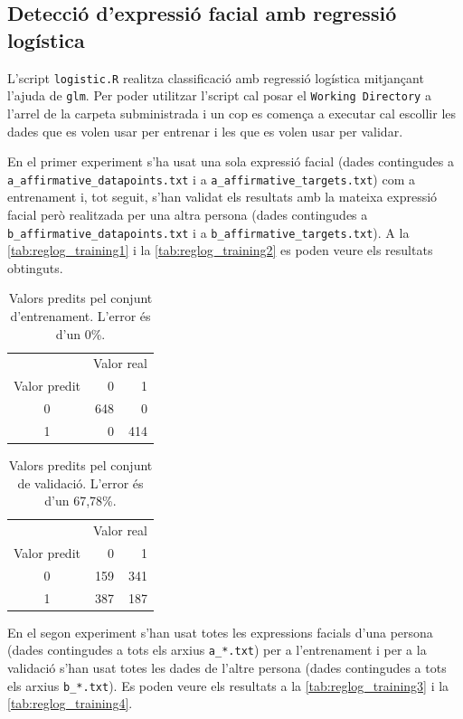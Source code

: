 \documentclass[a4paper]{article}
\begin{document}
\subsection{Detecció d'expressió facial amb regressió logística}
L'script \verb|logistic.R| realitza classificació amb regressió logística mitjançant l'ajuda de \verb|glm|. Per poder utilitzar l'script cal posar el \verb|Working Directory| a l'arrel de la carpeta subministrada i un cop es comença a executar cal escollir les dades que es volen usar per entrenar i les que es volen usar per validar.

En el primer experiment s'ha usat una sola expressió facial (dades contingudes a \verb|a_affirmative_datapoints.txt| i a \verb|a_affirmative_targets.txt|) com a entrenament i, tot seguit, s'han validat els resultats amb la mateixa expressió facial però realitzada per una altra persona (dades contingudes a \verb|b_affirmative_datapoints.txt| i a \verb|b_affirmative_targets.txt|). A la \autoref{tab:reglog_training1} i la \autoref{tab:reglog_training2} es poden veure els resultats obtinguts.

\begin{table}[H]
	\centering
	\def\arraystretch{1.5}
	\begin{tabular}{c|rr}
		& \multicolumn{2}{c}{Valor real} \\
		Valor predit & 0 & 1 \\
		\hline
		0 & 648 & 0 \\
		1 & 0 & 414 \\
	\end{tabular}
	\caption{Valors predits pel conjunt d'entrenament. L'error és d'un 0\%.}
	\label{tab:reglog_training1}
\end{table}

\begin{table}[H]
	\centering
	\def\arraystretch{1.5}
	\begin{tabular}{c|rr}
		& \multicolumn{2}{c}{Valor real} \\
		Valor predit & 0 & 1 \\
		\hline
		0 & 159 & 341 \\
		1 & 387 & 187 \\
	\end{tabular}
	\caption{Valors predits pel conjunt de validació. L'error és d'un 67,78\%.}
	\label{tab:reglog_training2}
\end{table}

En el segon experiment s'han usat totes les expressions facials d'una persona (dades contingudes a tots els arxius \verb|a_*.txt|) per a l'entrenament i per a la validació s'han usat totes les dades de l'altre persona (dades contingudes a tots els arxius \verb|b_*.txt|). Es poden veure els resultats a la \autoref{tab:reglog_training3} i la \autoref{tab:reglog_training4}.
\end{document}
